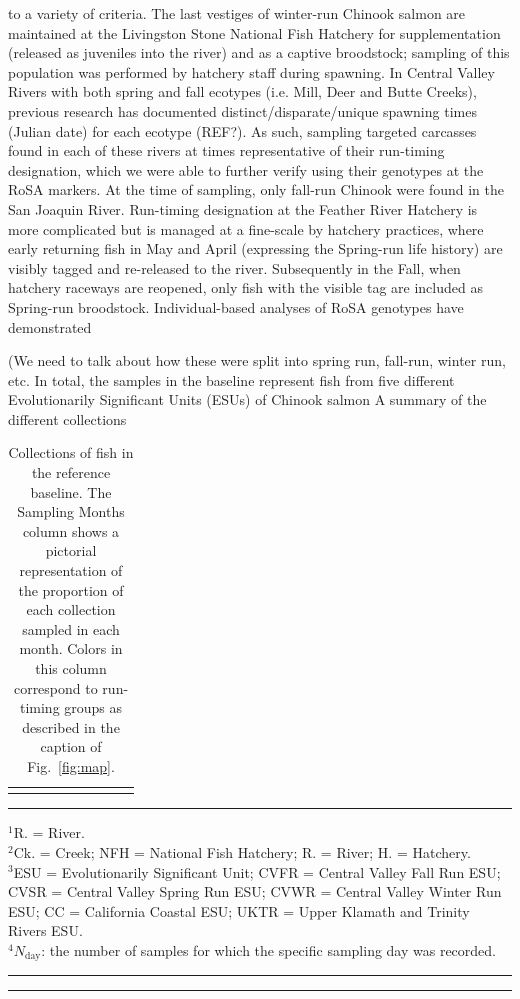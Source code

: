 to a variety of criteria. The last vestiges of winter-run Chinook salmon are maintained at the Livingston
Stone National Fish Hatchery for supplementation (released as juveniles into the river) and as a captive broodstock;
sampling of this population was performed by hatchery staff during spawning. In Central Valley Rivers with both 
spring and fall ecotypes (i.e. Mill, Deer and Butte Creeks), previous research has documented distinct/disparate/unique
spawning times (Julian date) for each ecotype (REF?). As such, sampling targeted carcasses found in each of these 
rivers at times representative of their run-timing designation, which we were able to further verify using their genotypes
at the RoSA markers. At the time of sampling, only fall-run Chinook were found in the San Joaquin River. Run-timing 
designation at the Feather River Hatchery is more complicated but is managed at a fine-scale by hatchery practices, 
where early returning fish in May and April (expressing the Spring-run life history) are visibly tagged and re-released 
to the river. Subsequently in the Fall, when hatchery raceways are reopened, only fish with the visible tag are included
as Spring-run broodstock. Individual-based analyses of RoSA genotypes have demonstrated 

(We need to talk about how these were split into spring run, fall-run, winter 
run, etc.
In total, the samples in the baseline represent fish from five different Evolutionarily Significant 
Units (ESUs) of Chinook salmon \citep{waples1991pacific} A summary of the different collections 
\begin{table}
\caption{\footnotesize Collections of fish in the reference baseline.  The Sampling Months column shows
a pictorial representation of the proportion of each collection sampled in each month.  Colors in
this column correspond to run-timing groups as described in the caption of Fig.~\protect\ref{fig:map}.}
\label{tab:samples}
{\footnotesize 
\begin{tabular*}{\linewidth}{@{\extracolsep{\fill}} llllllrcr}
\hline\hline\vspace*{0.4ex}

\end{tabular*}
}
\rule{3cm}{0.3pt}

{\footnotesize
$^1$R. = River.\\
$^2$Ck. = Creek; NFH = National Fish Hatchery; R. = River; H. = Hatchery.\\
$^3$ESU = Evolutionarily Significant Unit; CVFR = Central Valley Fall Run ESU; CVSR = Central Valley Spring Run ESU; CVWR = 
Central Valley Winter Run ESU; CC = California Coastal ESU; UKTR = Upper Klamath and Trinity Rivers ESU. \\
$^4N_\mathrm{day}$: the number of samples for which the specific sampling day was recorded.
}
\hrule\vspace*{0.3ex}\hrule
\end{table}

